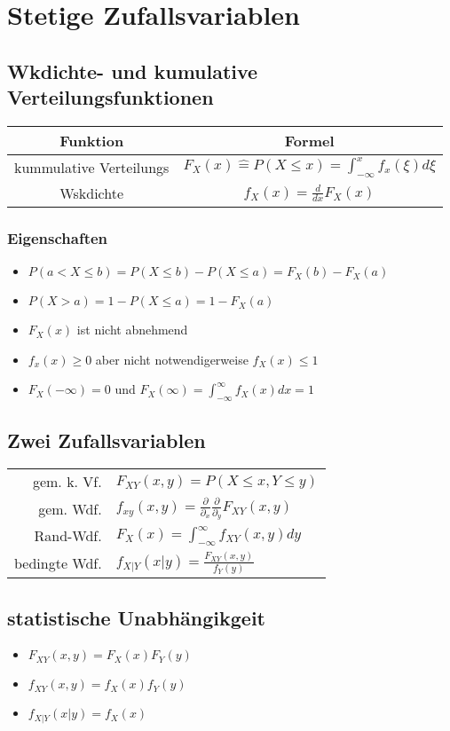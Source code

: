 \documentclass{article}
\begin{document}
\section{Stetige Zufallsvariablen}
\subsection{Wkdichte- und kumulative Verteilungsfunktionen}
\begin{tabular}{c | c}
Funktion & Formel \\ \hline
kummulative Verteilungs& $F_X (x) \hat{=}  P(X \leq x ) = \int_{-\infty}^x f_x(\xi)d\xi $ \\
Wskdichte  &$f_X(x) = \frac{d}{dx} F_X(x)$\\
\end{tabular}

\subsubsection{Eigenschaften}
\begin{itemize}
\item $P(a < X \leq b) = P(X\le b) - P(X \le a) = F_X (b) - F_X(a)$
\item $P(X > a) = 1-P(X \le a) = 1- F_X(a)$
\item $F_X(x) $ ist nicht abnehmend
\item$ f_x(x) \ge 0 $ aber nicht notwendigerweise $f_X(x) \leq 1$
 \item $F_X (-\infty) = 0$ und $ F_X(\infty) = \int_{-\infty}^\infty f_X(x) dx =1$
\end{itemize}

\subsection{Zwei Zufallsvariablen}
\begin{tabular}{r l}

gem. k. Vf.& $F_{XY} (x,y) = P(X \leq x, Y\leq y)$\\
gem. Wdf. & $f_{xy}(x,y) = \frac{\partial}{\partial_x} \frac{\partial}{\partial_y} F_{XY}(x,y)$\\
Rand-Wdf. & $F_X(x) = \int_{-\infty}^\infty f_{XY}(x,y) dy$\\
bedingte Wdf. & $f_{X|Y}(x|y) = \frac{F_{XY}(x,y)}{f_Y(y)}$\\

\end{tabular}
\subsection{statistische Unabh{\"a}ngikgeit}
\begin{itemize}
\item $F_{XY}(x,y) = F_X(x)F_Y(y)$ 
\item $f_{XY}(x,y) = f_X(x)f_Y(y)$ 
\item $f_{X|Y}(x|y) = f_X(x) $ 
\end{itemize}
\end{document}
